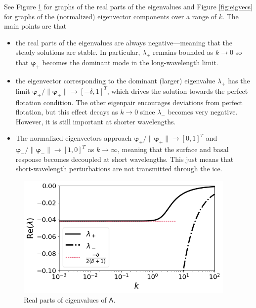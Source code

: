 \documentclass[paper=a4, fontsize=11pt]{article} %
\begin{document}
See Figure \ref{fig:eigvals} for graphs of the real parts of the eigenvalues and Figure \ref{fig:eigvecs}
for graphs of the (normalized) eigenvector components over a range of $k$.
The main points are that
\begin{itemize}
\item the real parts of the eigenvalues are always negative---meaning that the
steady solutions are stable. In particular, $\lambda_+$ remains bounded as $k\to 0$
so that $\pmb{\varphi}_+$ becomes the dominant mode in the long-wavelength limit.
\item the eigenvector corresponding to the dominant (larger)
eigenvalue $\lambda_+$ has the limit $\pmb{\varphi}_+/\|\pmb{\varphi}_+\|\to [-\delta,1]^T$,
which drives the solution towards the perfect flotation condition. The other
eigenpair encourages deviations from perfect flotation, but this effect
decays as $k\to 0$ since $\lambda_-$ becomes very negative. However, it is still
important at shorter wavelengths.
\item The normalized eigenvectors approach $\pmb{\varphi}_+/\|\pmb{\varphi}_+\| \to [0,1]^T$ and $\pmb{\varphi}_-/\|\pmb{\varphi}_-\|\to [1,0]^T$
as $k\to \infty$, meaning that the surface and basal response becomes decoupled
at short wavelengths.
This just means that short-wavelength perturbations are not transmitted through the ice.
\end{itemize}

\begin{figure}
  \centering
\includegraphics[width=0.95\textwidth]{figs/fig3.png}
\caption{Real parts of eigenvalues of $\mathsf{A}$.}
\label{fig:eigvals}
\end{figure}
\end{document}
